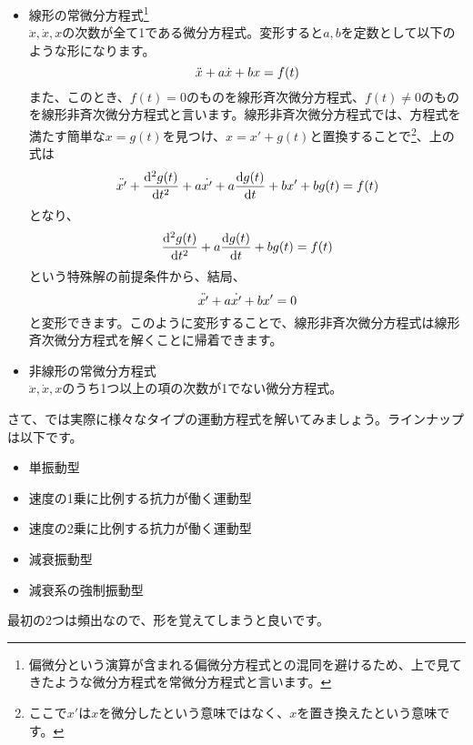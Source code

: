 \begin{itemize}
    \item 線形の常微分方程式\footnote{偏微分という演算が含まれる偏微分方程式との混同を避けるため、上で見てきたような微分方程式を常微分方程式と言います。}　\\
            $\ddot{x},\dot{x},x$の次数が全て1である微分方程式。変形すると$a,b$を定数として以下のような形になります。\\
            \begin{equation}
                \ddot{x} + a\dot{x} + bx = f(t) \notag
            \end{equation}
            また、このとき、$f(t)=0$のものを線形斉次微分方程式、$f(t)\neq 0$のものを線形非斉次微分方程式と言います。線形非斉次微分方程式では、方程式を満たす簡単な$x = g(t)$を見つけ、$x = x' + g(t)$と置換することで\footnote{ここで$x'$は$x$を微分したという意味ではなく、$x$を置き換えたという意味です。}、上の式は
            \begin{equation}
                \ddot{x'} + \frac{\mathrm{d^2}g(t)}{\mathrm{d}t^2} + a\dot{x'} + a\frac{\mathrm{d}g(t)}{\mathrm{d}t} + bx' + bg(t) = f(t) \notag
            \end{equation}
            となり、
            \begin{equation}
                \frac{\mathrm{d^2}g(t)}{\mathrm{d}t^2} + a\frac{\mathrm{d}g(t)}{\mathrm{d}t} + bg(t) = f(t) \notag
            \end{equation}
            という特殊解の前提条件から、結局、
            \begin{equation}
                \ddot{x'} + a\dot{x'} + bx' = 0 \notag
            \end{equation}
            と変形できます。このように変形することで、線形非斉次微分方程式は線形斉次微分方程式を解くことに帰着できます。
    \item 非線形の常微分方程式\\
            $\ddot{x},\dot{x},x$のうち1つ以上の項の次数が1でない微分方程式。
\end{itemize}

\par

さて、では実際に様々なタイプの運動方程式を解いてみましょう。ラインナップは以下です。
\begin{itemize}
    \item 単振動型
    \item 速度の1乗に比例する抗力が働く運動型
    \item 速度の2乗に比例する抗力が働く運動型
    \item 減衰振動型
    \item 減衰系の強制振動型
\end{itemize}
最初の2つは頻出なので、形を覚えてしまうと良いです。

